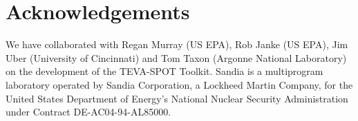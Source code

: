 \section*{Acknowledgements}

We have collaborated with Regan Murray (US EPA), Rob Janke (US EPA), Jim Uber (University of Cincinnati)
and Tom Taxon (Argonne National Laboratory) on the development of the TEVA-SPOT Toolkit. Sandia is a multiprogram
laboratory operated by Sandia Corporation, a Lockheed Martin Company, for the United States Department
of Energy's National Nuclear Security Administration under Contract DE-AC04-94-AL85000.
